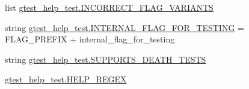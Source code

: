 \begin{DoxyCompactItemize}
\item 
list \mbox{\hyperlink{namespacegtest__help__test_a6f677b9f975f09db7604a5ee9c4821a3}{gtest\+\_\+help\+\_\+test.\+I\+N\+C\+O\+R\+R\+E\+C\+T\+\_\+\+F\+L\+A\+G\+\_\+\+V\+A\+R\+I\+A\+N\+TS}}
\item 
string \mbox{\hyperlink{namespacegtest__help__test_aa7f487cde98f691eecc5f1f5e67c0a69}{gtest\+\_\+help\+\_\+test.\+I\+N\+T\+E\+R\+N\+A\+L\+\_\+\+F\+L\+A\+G\+\_\+\+F\+O\+R\+\_\+\+T\+E\+S\+T\+I\+NG}} = F\+L\+A\+G\+\_\+\+P\+R\+E\+F\+IX + \textquotesingle{}internal\+\_\+flag\+\_\+for\+\_\+testing\textquotesingle{}
\item 
string \mbox{\hyperlink{namespacegtest__help__test_a70c7e8b24ce75dfa26ff540b861cdc54}{gtest\+\_\+help\+\_\+test.\+S\+U\+P\+P\+O\+R\+T\+S\+\_\+\+D\+E\+A\+T\+H\+\_\+\+T\+E\+S\+TS}}
\item 
\mbox{\hyperlink{namespacegtest__help__test_acaee97106f5b6ad6de66778688d4b906}{gtest\+\_\+help\+\_\+test.\+H\+E\+L\+P\+\_\+\+R\+E\+G\+EX}}
\end{DoxyCompactItemize}
